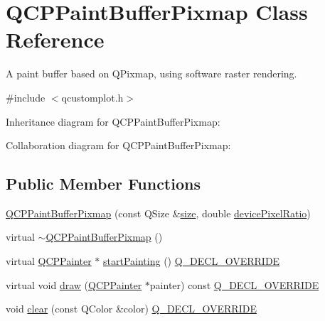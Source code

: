 \hypertarget{class_q_c_p_paint_buffer_pixmap}{}\section{Q\+C\+P\+Paint\+Buffer\+Pixmap Class Reference}
\label{class_q_c_p_paint_buffer_pixmap}


A paint buffer based on Q\+Pixmap, using software raster rendering.  




{\ttfamily \#include $<$qcustomplot.\+h$>$}



Inheritance diagram for Q\+C\+P\+Paint\+Buffer\+Pixmap\+:


Collaboration diagram for Q\+C\+P\+Paint\+Buffer\+Pixmap\+:
\subsection*{Public Member Functions}
\begin{DoxyCompactItemize}
\item 
\hyperlink{class_q_c_p_paint_buffer_pixmap_aef0224e03b9285509391fcd61a8e6844}{Q\+C\+P\+Paint\+Buffer\+Pixmap} (const Q\+Size \&\hyperlink{class_q_c_p_abstract_paint_buffer_a3ea8284e547985c5d263f26a6adfa11f}{size}, double \hyperlink{class_q_c_p_abstract_paint_buffer_aac1b981f8c1744036610ff1a6b9461f9}{device\+Pixel\+Ratio})
\item 
virtual \hyperlink{class_q_c_p_paint_buffer_pixmap_a52b00bff4a36085b197bd374d5d24450}{$\sim$\+Q\+C\+P\+Paint\+Buffer\+Pixmap} ()
\item 
virtual \hyperlink{class_q_c_p_painter}{Q\+C\+P\+Painter} $\ast$ \hyperlink{class_q_c_p_paint_buffer_pixmap_a357964ef7d28cfa530338be4e5c93234}{start\+Painting} () \hyperlink{qcustomplot_8h_a42cc5eaeb25b85f8b52d2a4b94c56f55}{Q\+\_\+\+D\+E\+C\+L\+\_\+\+O\+V\+E\+R\+R\+I\+DE}
\item 
virtual void \hyperlink{class_q_c_p_paint_buffer_pixmap_af7bfc685e56a0a9329e57cd9a265eb74}{draw} (\hyperlink{class_q_c_p_painter}{Q\+C\+P\+Painter} $\ast$painter) const \hyperlink{qcustomplot_8h_a42cc5eaeb25b85f8b52d2a4b94c56f55}{Q\+\_\+\+D\+E\+C\+L\+\_\+\+O\+V\+E\+R\+R\+I\+DE}
\item 
void \hyperlink{class_q_c_p_paint_buffer_pixmap_a14badbd010a3cde6b55817ccb7b65217}{clear} (const Q\+Color \&color) \hyperlink{qcustomplot_8h_a42cc5eaeb25b85f8b52d2a4b94c56f55}{Q\+\_\+\+D\+E\+C\+L\+\_\+\+O\+V\+E\+R\+R\+I\+DE}
\end{DoxyCompactItemize}
